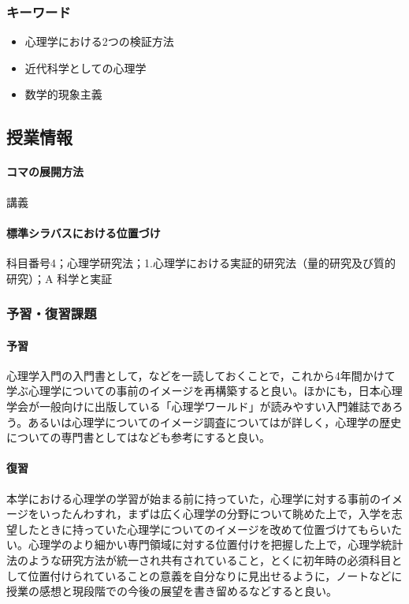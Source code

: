 \subsubsection{キーワード}
\begin{itemize}
	\item 心理学における2つの検証方法
	\item 近代科学としての心理学
	\item 数学的現象主義
\end{itemize}
\subsection{授業情報}
\paragraph{コマの展開方法}
講義
\paragraph{標準シラバスにおける位置づけ}
科目番号4；心理学研究法；1.心理学における実証的研究法（量的研究及び質的研究）；A 科学と実証
\subsubsection{予習・復習課題}
\paragraph{予習}
心理学入門の入門書として，\citet{Daihiko201507,Michimata200903}などを一読しておくことで，これから4年間かけて学ぶ心理学についての事前のイメージを再構築すると良い。ほかにも，日本心理学会が一般向けに出版している「心理学ワールド」が読みやすい入門雑誌であろう。あるいは心理学についてのイメージ調査については\citet{Kikuchi2018}が詳しく，心理学の歴史についての専門書としては\citet{Ohashi201610}なども参考にすると良い。
\paragraph{復習}
本学における心理学の学習が始まる前に持っていた，心理学に対する事前のイメージをいったんわすれ，まずは広く心理学の分野について眺めた上で，入学を志望したときに持っていた心理学についてのイメージを改めて位置づけてもらいたい。心理学のより細かい専門領域に対する位置付けを把握した上で，心理学統計法のような研究方法が統一され共有されていること，とくに初年時の必須科目として位置付けられていることの意義を自分なりに見出せるように，ノートなどに授業の感想と現段階での今後の展望を書き留めるなどすると良い。
